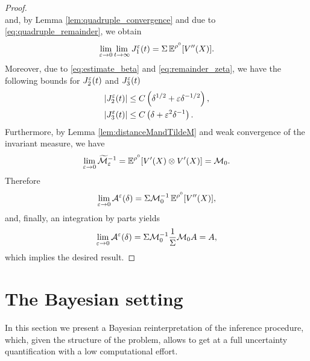 \documentclass[10pt]{article}
\begin{document}
\begin{proof}
\begin{equation}
	\end{equation}
	and, by Lemma \ref{lem:quadruple_convergence} and due to \eqref{eq:quadruple_remainder}, we obtain
	\begin{equation}
	\lim_{\varepsilon \to 0} \lim_{t \to \infty} J_1^\varepsilon(t) = \Sigma \operatorname{\mathbb{E}}^{\rho^0} [V''(X)].
	\end{equation}
	Moreover, due to \eqref{eq:estimate_beta} and \eqref{eq:remainder_zeta}, we have the following bounds for $J_2^\varepsilon(t)$ and $J_3^\varepsilon(t)$
	\begin{equation}
	\begin{aligned}
	\left\lvert J_2^\varepsilon(t)\right\rvert &\le C \left( \delta^{1/2} + \varepsilon \delta^{-1/2} \right), \\
	\left\lvert J_3^\varepsilon(t)\right\rvert &\le C \left( \delta + \varepsilon^2 \delta^{-1} \right).
	\end{aligned}
	\end{equation}
	Furthermore, by Lemma \ref{lem:distanceMandTildeM} and weak convergence of the invariant measure, we have
	\begin{equation}
	\lim_{\varepsilon \to 0} \widetilde{\mathcal M}_\varepsilon^{-1} = \operatorname{\mathbb{E}}^{\rho^0} [V'(X) \otimes V'(X) ] = \mathcal M_0.
	\end{equation}
	Therefore
	\begin{equation}
	\lim_{\varepsilon \to 0} \mathcal A^\varepsilon(\delta) = \Sigma \mathcal M_0^{-1} \operatorname{\mathbb{E}}^{\rho^0} [V''(X)],
	\end{equation}
	and, finally, an integration by parts yields
	\begin{equation}
	\lim_{\varepsilon \to 0} \mathcal A^\varepsilon(\delta) = \Sigma \mathcal M_0^{-1} \frac1\Sigma \mathcal M_0 A = A,
	\end{equation}
	which implies the desired result.
\end{proof}


\section{The Bayesian setting}\label{sec:Bayesian}

In this section we present a Bayesian reinterpretation of the inference procedure, which, given the structure of the problem, allows to get at a full uncertainty quantification with a low computational effort. 
\end{document}
